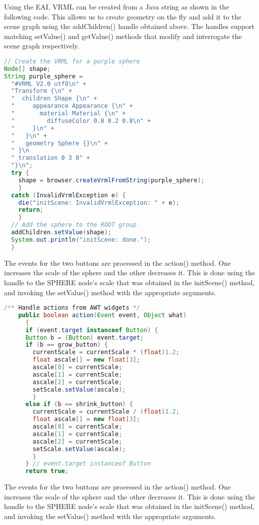 Using the EAI, VRML can be created from a Java string as shown in the following code. This allows us to create geometry on the fly and add it to the scene graph using the addChildren() handle obtained above. The handles support matching setValue() and getValue() methods that modify and interrogate the scene graph respectively.

\begin{lstlisting}[language=Java, caption={}, numbers=none, frame=none]
// Create the VRML for a purple sphere
Node[] shape;
String purple_sphere =
  "#VRML V2.0 utf8\n" +
  "Transform {\n" +
  "  children Shape {\n" +
  "     appearance Appearance {\n" +
  "       material Material {\n" +
  "         diffuseColor 0.8 0.2 0.8\n" +
  "     }\n" +
  "   }\n" +
  "   geometry Sphere {}\n" +
  " }\n
  " translation 0 3 0" +
  "}\n";
  try {
    shape = browser.createVrmlFromString(purple_sphere);
    }
  catch (InvalidVrmlException e) {
    die("initScene: InvalidVrmlException: " + e);
    return;
    }
  // Add the sphere to the ROOT group
  addChildren.setValue(shape);
  System.out.println("initScene: done.");
  }
\end{lstlisting}

The events for the two buttons are processed in the action() method. One increases the scale of the sphere and the other decreases it. This is done using the handle to the SPHERE node's scale that was obtained in the initScene() method, and invoking the setValue() method with the appropriate arguments.

\begin{lstlisting}[language=Java, caption={}, numbers=none, frame=none]
/** Handle actions from AWT widgets */
    public boolean action(Event event, Object what)
      {
      if (event.target instanceof Button) {
      Button b = (Button) event.target;
      if (b == grow_button) {
        currentScale = currentScale * (float)1.2;
        float ascale[] = new float[3];
        ascale[0] = currentScale;
        ascale[1] = currentScale;
        ascale[2] = currentScale;
        setScale.setValue(ascale);
        }
      else if (b == shrink_button) {
        currentScale = currentScale / (float)1.2;
        float ascale[] = new float[3];
        ascale[0] = currentScale;
        ascale[1] = currentScale;
        ascale[2] = currentScale;
        setScale.setValue(ascale);
        }
      } // event.target instanceof Button
      return true;
\end{lstlisting}

The events for the two buttons are processed in the action() method. One increases the scale of the sphere and the other decreases it. This is done using the handle to the SPHERE node's scale that was obtained in the initScene() method, and invoking the setValue() method with the appropriate arguments.

